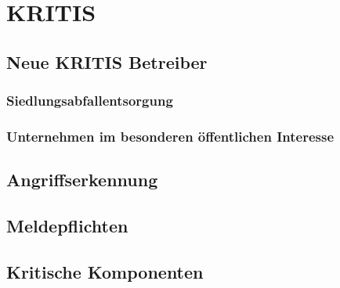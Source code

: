 \chapter{KRITIS}\label{ch:kritis}

\section{Neue KRITIS Betreiber}\label{sec:neue-kritis-betreiber}

\subsection{Siedlungsabfallentsorgung}\label{ssec:siedlungsabfallentsorgung}

\subsection{Unternehmen im besonderen öffentlichen Interesse}\label{ssec:unternehmen-im-besonderen-offentlichen-interesse}

\section{Angriffserkennung}\label{sec:angriffserkennung}

\section{Meldepflichten}\label{sec:meldepflichten}

\section{Kritische Komponenten}\label{sec:kritische-komponenten}
